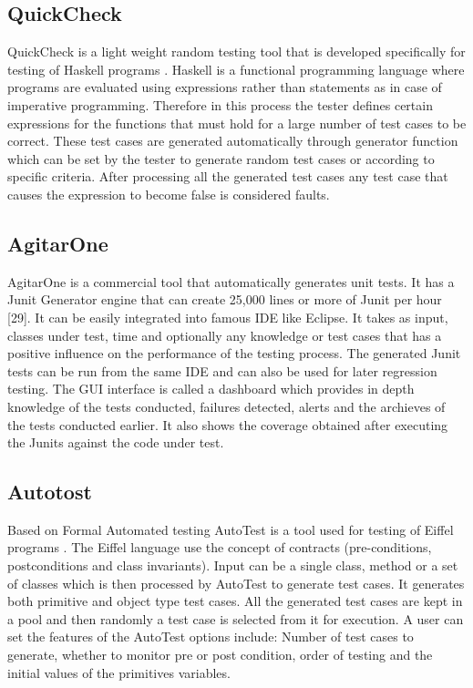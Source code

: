 \subsection{QuickCheck}
QuickCheck \cite{Claessen2000} is a light weight random testing tool that is developed specifically for testing of Haskell programs \cite{Hudak2007}. Haskell is a functional programming language where programs are evaluated using expressions rather than statements as in case of imperative programming. Therefore in this process the tester defines certain expressions for the functions that must hold for a large number of test cases to be correct. These test cases are generated automatically through generator function which can be set by the tester to generate random test cases or according to specific criteria. After processing all the generated test cases any test case that causes the expression to become false is considered faults.

\subsection{AgitarOne}
AgitarOne is a commercial tool that automatically generates unit tests. It has a Junit Generator engine that can create 25,000 lines or more of Junit per hour [29]. It can be easily integrated into famous IDE like Eclipse. It takes as input, classes under test, time and optionally any knowledge or test cases that has a positive influence on the performance of the testing process. The generated Junit tests can be run from the same IDE and can also be used for later regression testing. The GUI interface is called a dashboard which provides in depth knowledge of the tests conducted, failures detected, alerts and the archieves of the tests conducted earlier. It also shows the coverage obtained after executing the Junits against the code under test.

\subsection{Autotost}
Based on Formal Automated testing AutoTest is a tool used for testing of Eiffel programs \cite{Ciupa2007}. The Eiffel language use the concept of contracts (pre-conditions, postconditions and class invariants). Input can be a single class, method or a set of classes which is then processed by AutoTest to generate test cases. It generates both primitive and object type test cases. All the generated test cases are kept in a pool and then randomly a test case is selected from it for execution. A user can set the features of the AutoTest options include: Number of test cases to generate, whether to monitor pre or post condition, order of testing and the initial values of the primitives variables.

